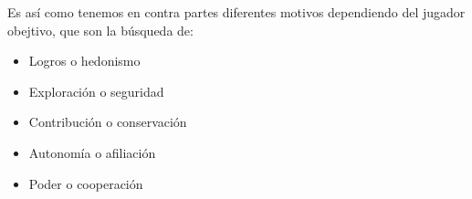 Es así como tenemos en contra partes diferentes motivos dependiendo del jugador obejtivo, que son la búsqueda de:
\begin{itemize}
	\item Logros o hedonismo
	\item Exploración o seguridad
	\item Contribución o conservación
	\item Autonomía o afiliación
	\item Poder o cooperación
\end{itemize}
 